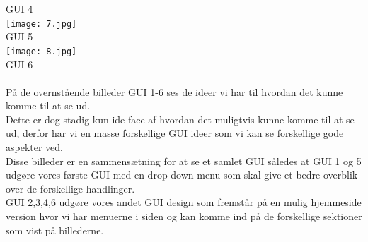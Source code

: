 \documentclass[a4paper]{article}
\begin{document}
GUI 4\\
\texttt{[image: 7.jpg]}\\
GUI 5\\
\texttt{[image: 8.jpg]}\\
GUI 6\\\\
På de overnstående billeder GUI 1-6 ses de ideer vi har til hvordan det kunne komme til at se ud.\\
Dette er dog stadig kun ide face af hvordan det muligtvis kunne komme til at se ud, derfor har vi en masse forskellige GUI ideer som vi kan se forskellige gode aspekter ved.\\
Disse billeder er en sammensætning for at se et samlet GUI således at GUI 1 og 5 udgøre vores første GUI med en drop down menu som skal give et bedre overblik over de forskellige handlinger.\\
GUI 2,3,4,6 udgøre vores andet GUI design som fremstår på en mulig hjemmeside version hvor vi har menuerne i siden og kan komme ind på de forskellige sektioner som vist på billederne.
\pagebreak
\end{document}
